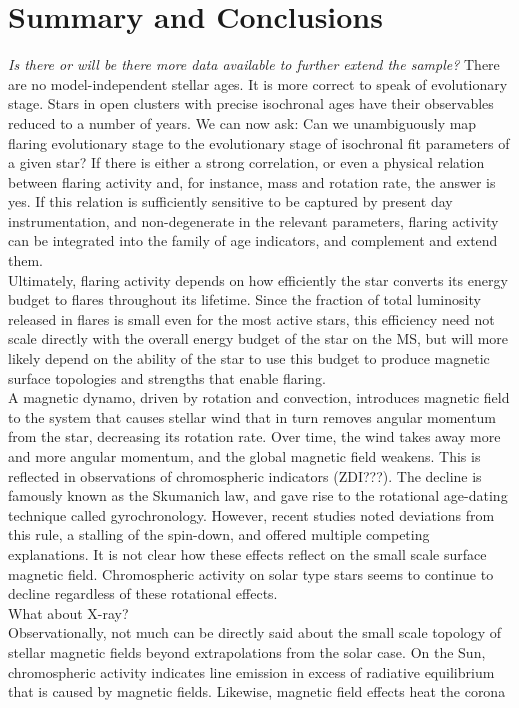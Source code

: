 \documentclass{aa}
\begin{document}
\section{Summary and Conclusions}
\textit{Is there or will be there more data available to further extend the sample? }
There are no model-independent stellar ages. It is more correct to speak of evolutionary stage. Stars in open clusters with precise isochronal ages have their observables reduced to a number of years. 
We can now ask: Can we unambiguously map flaring evolutionary stage to the evolutionary stage of isochronal fit parameters of a given star? If there is either a strong correlation, or even a physical relation between flaring activity and, for instance, mass and rotation rate, the answer is yes. If this relation is sufficiently sensitive to be captured by present day instrumentation, and non-degenerate in the relevant parameters, flaring activity can be integrated into the family of age indicators, and complement and extend them. 
\\
Ultimately, flaring activity depends on how efficiently the star converts its energy budget to flares throughout its lifetime. Since the fraction of total luminosity released in flares is small even for the most active stars, this efficiency need not scale directly with the overall energy budget of the star on the MS, but will more likely depend on the ability of the star to use this budget to produce magnetic surface topologies and strengths that enable flaring.
\\
A magnetic dynamo, driven by rotation and convection, introduces magnetic field to the system that causes stellar wind that in turn removes angular momentum from the star, decreasing its rotation rate. Over time, the wind takes away more and more angular momentum, and the global magnetic field weakens. This is reflected in observations of chromospheric indicators (ZDI???). The decline is famously known as the Skumanich law, and gave rise to the rotational age-dating technique called gyrochronology. However, recent studies noted deviations from this rule, a stalling of the spin-down, and offered multiple competing explanations. It is not clear how these effects reflect on the small scale surface magnetic field. Chromospheric activity on solar type stars seems to continue to decline regardless of these rotational effects. 
\\
What about X-ray?
\\
Observationally, not much can be directly said about the small scale topology of stellar magnetic fields beyond extrapolations from the solar case. On the Sun, chromospheric activity indicates line emission in excess of radiative equilibrium that is caused by magnetic fields. Likewise, magnetic field effects heat the corona
\end{document}
